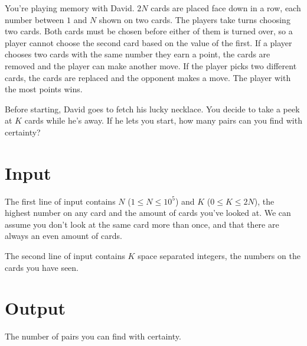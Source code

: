 You're playing memory with David. $2N$ cards are placed face down in a row, each number between $1$ and $N$ shown on two cards. The players take turns choosing two cards. Both cards must be chosen before either of them is turned over, so a player cannot choose the second card based on the value of the first. If a player chooses two cards with the same number they earn a point, the cards are removed and the player can make another move. If the player picks two different cards, the cards are replaced and the opponent makes a move. The player with the most points wins.

Before starting, David goes to fetch his lucky necklace. You decide to take a peek at $K$ cards while he's away. If he lets you start, how many pairs can you find with certainty?

\section*{Input}

The first line of input contains $N$ ($1 \leq N \leq 10^5$) and $K$ ($0 \leq K \leq 2N$), the highest number on any card and the amount of cards you've looked at. We can assume you don't look at the same card more than once, and that there are always an even amount of cards.

The second line of input contains $K$ space separated integers, the numbers on the cards you have seen. 

\section*{Output}

The number of pairs you can find with certainty.
